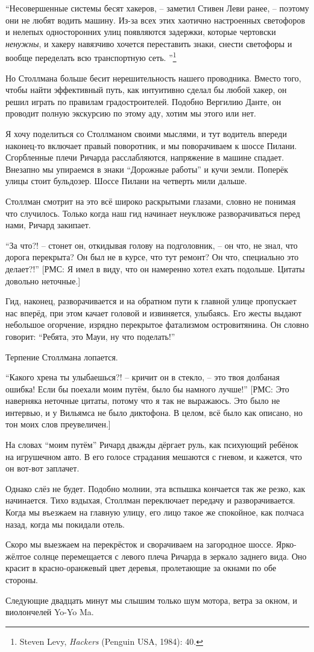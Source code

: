 \enquote{Несовершенные системы бесят хакеров, -- заметил Стивен Леви ранее, -- поэтому они не любят водить машину. Из-за всех этих хаотично настроенных светофоров и нелепых односторонних улиц появляются задержки, которые чертовски \textit{ненужны}, и хакеру навязчиво хочется переставить знаки, снести светофоры и вообще переделать всю транспортную сеть. }\footnote{Steven Levy, \textit{Hackers} (Penguin USA, 1984): 40.}

Но Столлмана больше бесит нерешительность нашего проводника. Вместо того, чтобы найти эффективный путь, как интуитивно сделал бы любой хакер, он решил играть по правилам градостроителей. Подобно Вергилию Данте, он проводит полную экскурсию по этому аду, хотим мы этого или нет.

Я хочу поделиться со Столлманом своими мыслями, и тут водитель впереди наконец-то включает правый поворотник, и мы поворачиваем к шоссе Пилани. Сгорбленные плечи Ричарда расслабляются, напряжение в машине спадает. Внезапно мы упираемся в знаки \enquote{Дорожные работы} и кучи земли. Поперёк улицы стоит бульдозер. Шоссе Пилани на четверть мили дальше.

Столлман смотрит на это всё широко раскрытыми глазами, словно не понимая что случилось. Только когда наш гид начинает неуклюже разворачиваться перед нами, Ричард закипает.

\enquote{За что?! -- стонет он, откидывая голову на подголовник, -- он что, не знал, что дорога перекрыта? Он был не в курсе, что тут ремонт? Он что, специально это делает?!} [РМС: Я имел в виду, что он намеренно хотел ехать подольше. Цитаты довольно неточные.]

Гид, наконец, разворачивается и на обратном пути к главной улице пропускает нас вперёд, при этом качает головой и извиняется, улыбаясь. Его жесты выдают небольшое огорчение, изрядно перекрытое фатализмом островитянина. Он словно говорит: \enquote{Ребята, это Мауи, ну что поделать!}

Терпение Столлмана лопается.

\enquote{Какого хрена ты улыбаешься?! -- кричит он в стекло, -- это твоя долбаная ошибка! Если бы поехали моим путём, было бы намного лучше!} [РМС: Это наверняка неточные цитаты, потому что я так не выражаюсь. Это было не интервью, и у Вильямса не было диктофона. В целом, всё было как описано, но тон моих слов преувеличен.]

На словах \enquote{моим путём} Ричард дважды дёргает руль, как психующий ребёнок на игрушечном авто. В его голосе страдания мешаются с гневом, и кажется, что он вот-вот заплачет.

Однако слёз не будет. Подобно молнии, эта вспышка кончается так же резко, как начинается. Тихо вздыхая, Столлман переключает передачу и разворачивается. Когда мы въезжаем на главную улицу, его лицо такое же спокойное, как полчаса назад, когда мы покидали отель.

Скоро мы выезжаем на перекрёсток и сворачиваем на загородное шоссе. Ярко-жёлтое солнце перемещается с левого плеча Ричарда в зеркало заднего вида. Оно красит в красно-оранжевый цвет деревья, пролетающие за окнами по обе стороны.

Следующие двадцать минут мы слышим только шум мотора, ветра за окном, и виолончелей Yo-Yo Ma.
